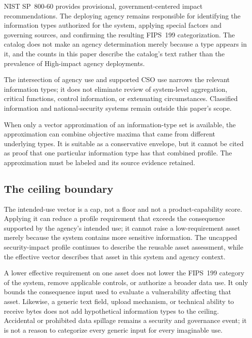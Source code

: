 \documentclass[11pt]{article}
\begin{document}
NIST SP~800-60 provides provisional, government-centered impact recommendations.
The deploying agency remains responsible for identifying the information types
authorized for the system, applying special factors and governing sources, and
confirming the resulting FIPS~199 categorization. The catalog does not make an
agency determination merely because a type appears in it, and the counts in this
paper describe the catalog's text rather than the prevalence of High-impact agency
deployments.

The intersection of agency use and supported CSO use narrows the relevant
information types; it does not eliminate review of system-level aggregation,
critical functions, control information, or extenuating circumstances. Classified
information and national-security systems remain outside this paper's scope.

When only a vector approximation of an information-type set is available, the
approximation can combine objective maxima that came from different underlying
types. It is suitable as a conservative envelope, but it cannot be cited as proof
that one particular information type has that combined profile. The approximation
must be labeled and its source evidence retained.

\subsection{The ceiling boundary}

The intended-use vector is a cap, not a floor and not a product-capability score.
Applying it can reduce a profile requirement that exceeds the consequence
supported by the agency's intended use; it cannot raise a low-requirement asset
merely because the system contains more sensitive information. The uncapped
security-impact profile continues to describe the reusable asset assessment, while
the effective vector describes that asset in this system and agency context.

A lower effective requirement on one asset does not lower the FIPS~199 category of
the system, remove applicable controls, or authorize a broader data use. It only
bounds the consequence input used to evaluate a vulnerability affecting that
asset. Likewise, a generic text field, upload mechanism, or technical ability to
receive bytes does not add hypothetical information types to the ceiling.
Accidental or prohibited data spillage remains a security and governance event; it
is not a reason to categorize every generic input for every imaginable use.
\end{document}
